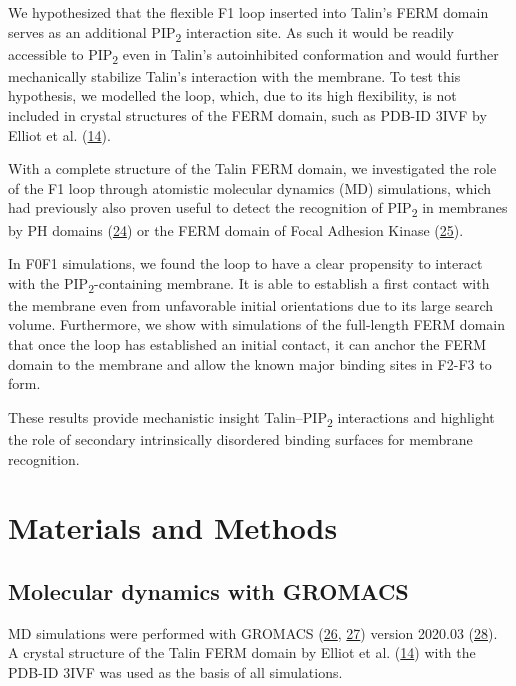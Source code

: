 \documentclass[
  twocolumn]{biophys-new-mod}
\begin{document}
We hypothesized that the flexible F1 loop inserted into Talin's FERM
domain serves as an additional PIP\textsubscript{2} interaction site. As
such it would be readily accessible to PIP\textsubscript{2} even in
Talin's autoinhibited conformation and would further mechanically
stabilize Talin's interaction with the membrane. To test this
hypothesis, we modelled the loop, which, due to its high flexibility, is
not included in crystal structures of the FERM domain, such as PDB-ID
3IVF by Elliot et al.
(\protect\hyperlink{ref-elliottStructureTalinHead2010}{14}).

With a complete structure of the Talin FERM domain, we investigated the
role of the F1 loop through atomistic molecular dynamics (MD)
simulations, which had previously also proven useful to detect the
recognition of PIP\textsubscript{2} in membranes by PH domains
(\protect\hyperlink{ref-buyanMultiscaleSimulationsSuggest2016}{24}) or
the FERM domain of Focal Adhesion Kinase
(\protect\hyperlink{ref-zhouMechanismFocalAdhesion2015}{25}).

In F0F1 simulations, we found the loop to have a clear propensity to
interact with the PIP\textsubscript{2}-containing membrane. It is able
to establish a first contact with the membrane even from unfavorable
initial orientations due to its large search volume. Furthermore, we
show with simulations of the full-length FERM domain that once the loop
has established an initial contact, it can anchor the FERM domain to the
membrane and allow the known major binding sites in F2-F3 to form.

These results provide mechanistic insight Talin--PIP\textsubscript{2}
interactions and highlight the role of secondary intrinsically
disordered binding surfaces for membrane recognition.

\hypertarget{materials-and-methods}{%
\section{Materials and Methods}\label{materials-and-methods}}

\hypertarget{molecular-dynamics-with-gromacs}{%
\subsection{Molecular dynamics with
GROMACS}\label{molecular-dynamics-with-gromacs}}

MD simulations were performed with GROMACS
(\protect\hyperlink{ref-berendsenGROMACSMessagepassingParallel1995}{26},
\protect\hyperlink{ref-abrahamGROMACSHighPerformance2015}{27}) version
2020.03 (\protect\hyperlink{ref-lindahlGROMACS2020Source2020}{28}). A
crystal structure of the Talin FERM domain by Elliot et al.
(\protect\hyperlink{ref-elliottStructureTalinHead2010}{14}) with the
PDB-ID 3IVF was used as the basis of all simulations.
\end{document}
